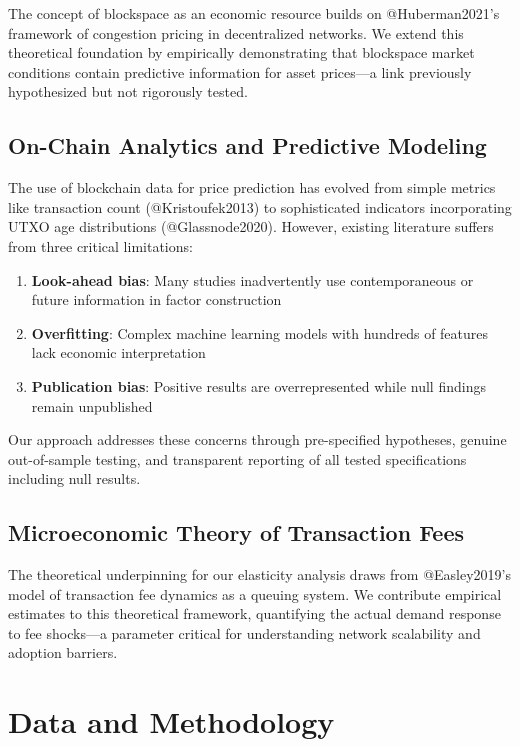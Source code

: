 \documentclass[
  12pt,
  letterpaper,
  DIV=11,
  numbers=noendperiod]{scrartcl}
\providecommand{\tightlist}{%
  \setlength{\itemsep}{0pt}\setlength{\parskip}{0pt}}
\begin{document}
The concept of blockspace as an economic resource builds on
@Huberman2021's framework of congestion pricing in decentralized
networks. We extend this theoretical foundation by empirically
demonstrating that blockspace market conditions contain predictive
information for asset prices---a link previously hypothesized but not
rigorously tested.

\subsection{On-Chain Analytics and Predictive
Modeling}\label{on-chain-analytics-and-predictive-modeling}

The use of blockchain data for price prediction has evolved from simple
metrics like transaction count (@Kristoufek2013) to sophisticated
indicators incorporating UTXO age distributions (@Glassnode2020).
However, existing literature suffers from three critical limitations:

\begin{enumerate}
\def\labelenumi{\arabic{enumi}.}
\tightlist
\item
  \textbf{Look-ahead bias}: Many studies inadvertently use
  contemporaneous or future information in factor construction
\item
  \textbf{Overfitting}: Complex machine learning models with hundreds of
  features lack economic interpretation
\item
  \textbf{Publication bias}: Positive results are overrepresented while
  null findings remain unpublished
\end{enumerate}

Our approach addresses these concerns through pre-specified hypotheses,
genuine out-of-sample testing, and transparent reporting of all tested
specifications including null results.

\subsection{Microeconomic Theory of Transaction
Fees}\label{microeconomic-theory-of-transaction-fees}

The theoretical underpinning for our elasticity analysis draws from
@Easley2019's model of transaction fee dynamics as a queuing system. We
contribute empirical estimates to this theoretical framework,
quantifying the actual demand response to fee shocks---a parameter
critical for understanding network scalability and adoption barriers.

\section{Data and Methodology}\label{data-and-methodology}
\end{document}
